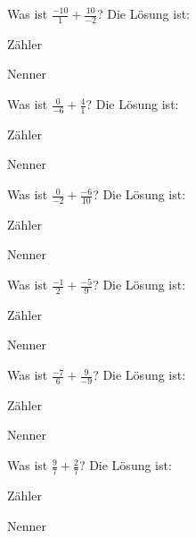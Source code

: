 \documentclass{ximera}
\begin{document}
\begin{shuffle}
\begin{question}
Was ist $\frac{-10}{1} + \frac{10}{-2}$?
Die Lösung ist:
\begin{solution}
Zähler 
\end{solution}
\begin{solution}
Nenner 
\end{solution}
\end{question}


\begin{question}
Was ist $\frac{0}{-6} + \frac{4}{1}$?
Die Lösung ist:
\begin{solution}
Zähler 
\end{solution}
\begin{solution}
Nenner 
\end{solution}
\end{question}


\begin{question}
Was ist $\frac{0}{-2} + \frac{-6}{10}$?
Die Lösung ist:
\begin{solution}
Zähler 
\end{solution}
\begin{solution}
Nenner 
\end{solution}
\end{question}


\begin{question}
Was ist $\frac{-1}{2} + \frac{-5}{9}$?
Die Lösung ist:
\begin{solution}
Zähler 
\end{solution}
\begin{solution}
Nenner 
\end{solution}
\end{question}


\begin{question}
Was ist $\frac{-7}{6} + \frac{9}{-9}$?
Die Lösung ist:
\begin{solution}
Zähler 
\end{solution}
\begin{solution}
Nenner 
\end{solution}
\end{question}


\begin{question}
Was ist $\frac{9}{7} + \frac{2}{7}$?
Die Lösung ist:
\begin{solution}
Zähler 
\end{solution}
\begin{solution}
Nenner 
\end{solution}
\end{question}



\end{shuffle}
\end{document}
